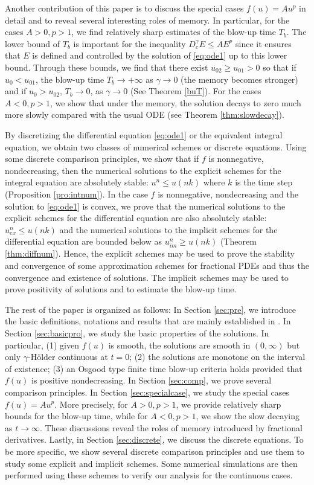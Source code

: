 \documentclass[12pt]{amsart}%
\theoremstyle{definition}
\theoremstyle{remark}
\renewcommand{\ge}{\geqslant}
\renewcommand{\le}{\leqslant}
\begin{document}
Another contribution of this paper is to discuss the special cases $f(u)=Au^p$ in detail and to reveal several interesting roles of memory. In particular, for the cases $A>0, p>1$, we find relatively sharp estimates of the blow-up time $T_b$. The lower bound of $T_b$ is important for the inequality $D_c^{\gamma}E\le AE^p$ since it ensures that $E$ is defined and controlled by the solution of \eqref{eq:ode1} up to this lower bound. Through these bounds,  we find that there exist $u_{02}\ge u_{01}>0$ so that if $u_0<u_{01}$, the blow-up time $T_b\to +\infty$ as $\gamma\to 0$ (the memory becomes stronger) and if $u_0>u_{02}$, $T_b\to 0$, as $\gamma\to 0$ (See Theorem \ref{buT}). For the cases $A<0, p>1$, we show that under the memory, the solution decays to zero much more slowly compared with the usual ODE (see Theorem \ref{thm:slowdecay}).


By discretizing the differential equation \eqref{eq:ode1} or the equivalent integral equation, we obtain two classes of numerical schemes or discrete equations. Using some discrete comparison principles, we show that if $f$ is nonnegative, nondecreasing, then the numerical solutions to the explicit schemes for the integral equation are absolutely stable: $u^n \le u(nk)$ where $k$ is the time step (Proposition \ref{pro:intnum}). 
In the case $f$ is nonnegative, nondecreasing and the solution to \eqref{eq:ode1} is convex, we prove that the numerical solutions to the explicit schemes for the differential equation are also absolutely stable: $u_{ex}^n\le u(nk)$ and  the numerical solutions to the implicit schemes for the differential equation are bounded below as $u_{im}^n\ge u(nk)$ (Theorem \ref{thm:diffnum}). Hence, the explicit schemes may be used to prove the stability and convergence of some approximation schemes for fractional PDEs and thus the convergence and existence of solutions. The implicit schemes may be used to prove positivity of solutions and to estimate the blow-up time. 
 
 The rest of the paper is organized as follows: In Section \ref{sec:pre}, we introduce the basic definitions, notations and results that are mainly established in \cite{liliu16}. In Section \ref{sec:basicpro}, we study the basic properties of the solutions. In particular, (1) given $f(u)$ is smooth, the solutions are smooth in $(0,\infty)$ but only $\gamma$-H\"older continuous at $t=0$; (2) the solutions are monotone on the interval of existence; (3) an Osgood type finite time blow-up criteria holds provided that $f(u)$ is positive nondecreasing.  In Section \ref{sec:comp}, we prove several comparison principles. In Section \ref{sec:specialcase}, we study the special cases $f(u)=Au^p$. More precisely, for $A>0, p>1$, we provide relatively sharp bounds for the blow-up time, while for $A<0, p>1$, we show the slow decaying as $t\to\infty$. These discussions reveal the roles of memory introduced by fractional derivatives. Lastly, in Section \ref{sec:discrete}, we discuss the discrete equations. To be more specific, we show several discrete comparison principles and use them to study some explicit and implicit schemes. Some numerical simulations are then performed using these schemes to verify our analysis for the continuous cases.
\end{document}
